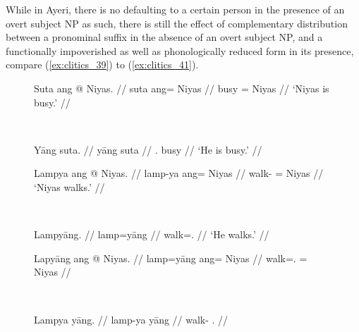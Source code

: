 While in Ayeri, there is no defaulting to a certain person in the presence of
an overt subject NP as such, there is still the effect of complementary
distribution between a pronominal suffix in the absence of an overt subject NP,
and a functionally impoverished as well as phonologically reduced form in its
presence, compare (\ref{ex:clitics_39}) to (\ref{ex:clitics_41}).

\begin{figure}
\ex{}\label{ex:clitics_39}
\begin{minipage}[t]{.5\remaining}
\tl\quad\label{ex:clitics_39a}\begingl
	\gla Suta ang @ Niyas. //
	\glb suta ang= Niyas //
	\glc busy \Aarg{}= Niyas //
	\glft `Niyas is busy.' //
\endgl
\end{minipage}
~
\begin{minipage}[t]{.5\remaining}
\tl\quad\label{ex:clitics_39b}\begingl
	\gla Yāng suta. //
	\glb yāng suta //
	\glc \TsgM{}.\Aarg{} busy //
	\glft `He is busy.' //
\endgl
\end{minipage}
\xe\smallskip

\ex{}\label{ex:clitics_40}
\begin{minipage}[t]{.5\remaining}
\tl\quad\label{ex:clitics_40a}\begingl
	\gla Lampya ang @ Niyas. //
	\glb lamp-ya ang= Niyas //
	\glc walk-\TsgM{} \Aarg{}= Niyas //
	\glft `Niyas walks.' //
\endgl
\end{minipage}
~
\begin{minipage}[t]{.5\remaining}
\tl\quad\label{ex:clitics_40b}\begingl
	\gla Lampyāng. //
	\glb lamp=yāng //
	\glc walk=\TsgM{}.\Aarg{} //
	\glft `He walks.' //
\endgl
\end{minipage}
\xe\smallskip

\ex{}\label{ex:clitics_41}
\begin{minipage}[t]{.5\remaining}
\tl\quad\label{ex:clitics_41a}\ljudge{*}\begingl
	\gla Lapyāng ang @ Niyas. //
	\glb lamp=yāng ang= Niyas //
	\glc walk=\TsgM{}.\Aarg{} \Aarg{}= Niyas //
\endgl
\end{minipage}
~
\begin{minipage}[t]{.5\remaining}
\tl\quad\label{ex:clitics_41b}\ljudge{*}\begingl
	\gla Lampya yāng. //
	\glb lamp-ya yāng //
	\glc walk-\TsgM{} \TsgM{}.\Aarg{} //
\endgl
\end{minipage}
\xe
\end{figure}

